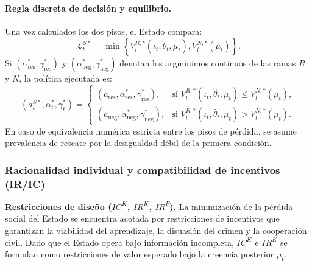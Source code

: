\documentclass[12pt]{article}
\theoremstyle{definition}
\theoremstyle{remark}
\newcommand{\1}{\mathbf{1}}
\begin{document}
\paragraph{Regla discreta de decisión y equilibrio.}
Una vez calculados los dos pisos, el Estado compara:
\begin{equation}
\label{eq:state-expected-loss}
\mathcal L_t^{S*}
=
\min\left\{
V_t^{R,*}(\iota_t,\hat{\theta}_t,\mu_t),
V_t^{N,*}(\mu_t)
\right\}.
\end{equation}
Si $(\alpha_{\mathrm{res}}^*,\gamma_{\mathrm{res}}^*)$ y $(\alpha_{\mathrm{neg}}^*,\gamma_{\mathrm{neg}}^*)$ denotan los argmínimos continuos de las ramas $R$ y $N$, la política ejecutada es:
\begin{equation}
\label{eq:state-discrete-rule}
(a_t^{S*},\alpha_t^*,\gamma_t^*)
=
\begin{cases}
(a_{\mathrm{res}},\alpha_{\mathrm{res}}^*,\gamma_{\mathrm{res}}^*),
& \text{si } V_t^{R,*}(\iota_t,\hat{\theta}_t,\mu_t)\le V_t^{N,*}(\mu_t),\\[6pt]
(a_{\mathrm{neg}},\alpha_{\mathrm{neg}}^*,\gamma_{\mathrm{neg}}^*),
& \text{si } V_t^{R,*}(\iota_t,\hat{\theta}_t,\mu_t)>V_t^{N,*}(\mu_t).
\end{cases}
\end{equation}
En caso de equivalencia numérica estricta entre los pisos de pérdida, se asume prevalencia de rescate por la desigualdad débil de la primera condición.



\subsubsection{Racionalidad individual y compatibilidad de incentivos (IR/IC)}
\label{subsec:ir-ic}

\noindent \textbf{Restricciones de diseño \textup{(}$IC^{K}$, $IR^{K}$, $IR^{F}$\textup{)}.} La minimización de la pérdida social del Estado se encuentra acotada por restricciones de incentivos que garantizan la viabilidad del aprendizaje, la disuasión del crimen y la cooperación civil. Dado que el Estado opera bajo información incompleta, $IC^K$ e $IR^K$ se formulan como restricciones de valor esperado bajo la creencia posterior $\mu_t$.
\end{document}
